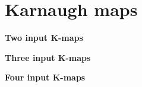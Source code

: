 \section{Karnaugh maps}

\textbf{Two input K-maps}
\vspace{10em}

% 

% 
  
\textbf{Three input K-maps}
\vspace{10em}



\textbf{Four input K-maps}
\vspace{10em}



